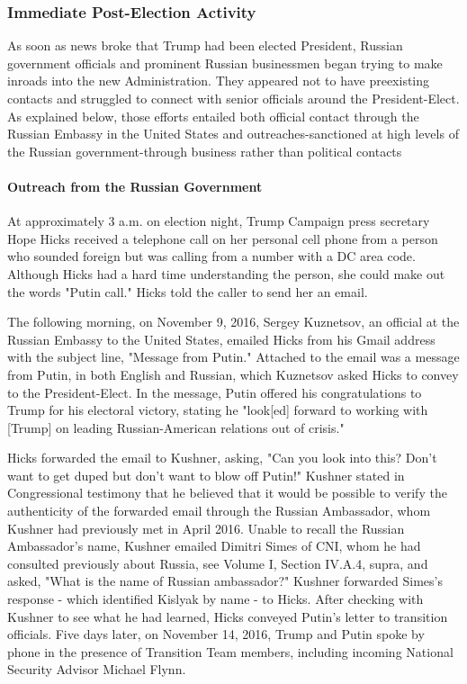 \subsubsection{Immediate Post-Election Activity}

As soon as news broke that Trump had been elected President, Russian government officials and prominent Russian businessmen began trying to make inroads into the new Administration.
They appeared not to have preexisting contacts and struggled to connect with senior officials around the President-Elect.
As explained below, those efforts entailed both official contact through the Russian Embassy in the United States and outreaches-sanctioned at high levels of the Russian government-through business rather than political contacts

\paragraph{Outreach from the Russian Government}

At approximately 3 a.m. on election night, Trump Campaign press secretary Hope Hicks received a telephone call on her personal cell phone from a person who sounded foreign but was calling from a number with a DC area code.%
Although Hicks had a hard time understanding the person, she could make out the words "Putin call."%
Hicks told the caller to send her an email.%

The following morning, on November 9, 2016, Sergey Kuznetsov, an official at the Russian Embassy to the United States, emailed Hicks from his Gmail address with the subject line, "Message from Putin."%
Attached to the email was a message from Putin, in both English and Russian, which Kuznetsov asked Hicks to convey to the President-Elect.%
In the message, Putin offered his congratulations to Trump for his electoral victory, stating he "look[ed] forward to working with [Trump] on leading Russian-American relations out of crisis."%

Hicks forwarded the email to Kushner, asking, "Can you look into this?
Don't want to get duped but don't want to blow off Putin!"%
Kushner stated in Congressional testimony that he believed that it would be possible to verify the authenticity of the forwarded email through the Russian Ambassador, whom Kushner had previously met in April 2016.%
Unable to recall the Russian Ambassador's name, Kushner emailed Dimitri Simes of CNI, whom he had consulted previously about Russia, see Volume I, Section IV.A.4, supra, and asked, "What is the name of Russian ambassador?"%
Kushner forwarded Simes's response - which identified Kislyak by name - to Hicks.%
After checking with Kushner to see what he had learned, Hicks conveyed Putin's letter to transition officials.%
Five days later, on November 14, 2016, Trump and Putin spoke by phone in the presence of Transition Team members, including incoming National Security Advisor Michael Flynn.%

